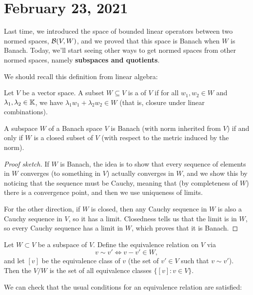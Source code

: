 \pagebreak\section*{February 23, 2021}

Last time, we introduced the space of bounded linear operators between two normed spaces, $\mathcal{B}(V, W)$, and we proved that this space is Banach when $W$ is Banach. Today, we'll start seeing other ways to get normed spaces from other normed spaces, namely \textbf{subspaces and quotients}.

We should recall this definition from linear algebra:

\begin{definition}
Let $V$ be a vector space. A subset $W \subseteq V$ is a  of $V$ if for all $w_1, w_2 \in W$ and $\lambda_1, \lambda_2 \in \mathbb K$, we have $\lambda_1 w_1 + \lambda_2 w_2 \in W$ (that is, closure under linear combinations).
\end{definition}

\begin{proposition}
A subspace $W$ of a Banach space $V$ is Banach (with norm inherited from $V$) if and only if $W$ is a closed subset of $V$ (with respect to the metric induced by the norm).
\end{proposition}
\begin{proof}[Proof sketch]
If $W$ is Banach, the idea is to show that every sequence of elements in $W$ converges (to something in $V$) actually converges in $W$, and we show this by noticing that the sequence must be Cauchy, meaning that (by completeness of $W$) there is a convergence point, and then we use uniqueness of limits. 

For the other direction, if $W$ is closed, then any Cauchy sequence in $W$ is also a Cauchy sequence in $V$, so it has a limit. Closedness tells us that the limit is in $W$, so every Cauchy sequence has a limit in $W$, which proves that it is Banach.
\end{proof}

\begin{definition}
Let $W \subset V$ be a subspace of $V$. Define the equivalence relation on $V$ via 
\[
    v \sim v' \iff v - v' \in W,
\]
and let $[v]$ be the equivalence class of $v$ (the set of $v' \in V$ such that $v \sim v'$). Then the  $V/W$ is the set of all equivalence classes $\{[v]: v \in V\}$.
\end{definition}

We can check that the usual conditions for an equivalence relation are satisfied:

